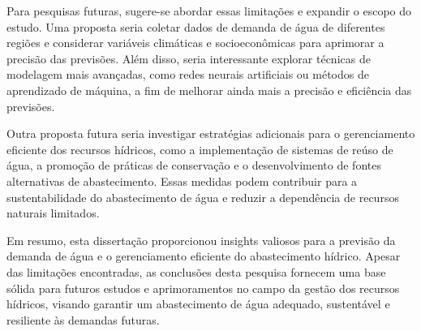 Para pesquisas futuras, sugere-se abordar essas limitações e expandir o escopo do estudo. Uma proposta seria coletar dados de demanda de água de diferentes regiões e considerar variáveis climáticas e socioeconômicas para aprimorar a precisão das previsões. Além disso, seria interessante explorar técnicas de modelagem mais avançadas, como redes neurais artificiais ou métodos de aprendizado de máquina, a fim de melhorar ainda mais a precisão e eficiência das previsões.

Outra proposta futura seria investigar estratégias adicionais para o gerenciamento eficiente dos recursos hídricos, como a implementação de sistemas de reúso de água, a promoção de práticas de conservação e o desenvolvimento de fontes alternativas de abastecimento. Essas medidas podem contribuir para a sustentabilidade do abastecimento de água e reduzir a dependência de recursos naturais limitados.

Em resumo, esta dissertação proporcionou insights valiosos para a previsão da demanda de água e o gerenciamento eficiente do abastecimento hídrico. Apesar das limitações encontradas, as conclusões desta pesquisa fornecem uma base sólida para futuros estudos e aprimoramentos no campo da gestão dos recursos hídricos, visando garantir um abastecimento de água adequado, sustentável e resiliente às demandas futuras.


